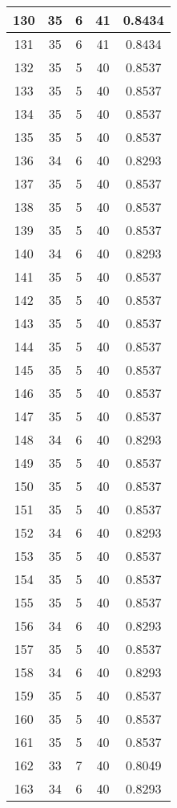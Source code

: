 \documentclass[letterpaper, 12pt]{article}
\begin{document}
\begin{longtable}{|c|c|c|c|c|}
130 & 35 & 6 & 41 & 0.8434 \\
\hline
131 & 35 & 6 & 41 & 0.8434 \\
\hline
132 & 35 & 5 & 40 & 0.8537 \\
\hline
133 & 35 & 5 & 40 & 0.8537 \\
\hline
134 & 35 & 5 & 40 & 0.8537 \\
\hline
135 & 35 & 5 & 40 & 0.8537 \\
\hline
136 & 34 & 6 & 40 & 0.8293 \\
\hline
137 & 35 & 5 & 40 & 0.8537 \\
\hline
138 & 35 & 5 & 40 & 0.8537 \\
\hline
139 & 35 & 5 & 40 & 0.8537 \\
\hline
140 & 34 & 6 & 40 & 0.8293 \\
\hline
141 & 35 & 5 & 40 & 0.8537 \\
\hline
142 & 35 & 5 & 40 & 0.8537 \\
\hline
143 & 35 & 5 & 40 & 0.8537 \\
\hline
144 & 35 & 5 & 40 & 0.8537 \\
\hline
145 & 35 & 5 & 40 & 0.8537 \\
\hline
146 & 35 & 5 & 40 & 0.8537 \\
\hline
147 & 35 & 5 & 40 & 0.8537 \\
\hline
148 & 34 & 6 & 40 & 0.8293 \\
\hline
149 & 35 & 5 & 40 & 0.8537 \\
\hline
150 & 35 & 5 & 40 & 0.8537 \\
\hline
151 & 35 & 5 & 40 & 0.8537 \\
\hline
152 & 34 & 6 & 40 & 0.8293 \\
\hline
153 & 35 & 5 & 40 & 0.8537 \\
\hline
154 & 35 & 5 & 40 & 0.8537 \\
\hline
155 & 35 & 5 & 40 & 0.8537 \\
\hline
156 & 34 & 6 & 40 & 0.8293 \\
\hline
157 & 35 & 5 & 40 & 0.8537 \\
\hline
158 & 34 & 6 & 40 & 0.8293 \\
\hline
159 & 35 & 5 & 40 & 0.8537 \\
\hline
160 & 35 & 5 & 40 & 0.8537 \\
\hline
161 & 35 & 5 & 40 & 0.8537 \\
\hline
162 & 33 & 7 & 40 & 0.8049 \\
\hline
163 & 34 & 6 & 40 & 0.8293 \\

\end{longtable}
\end{document}
